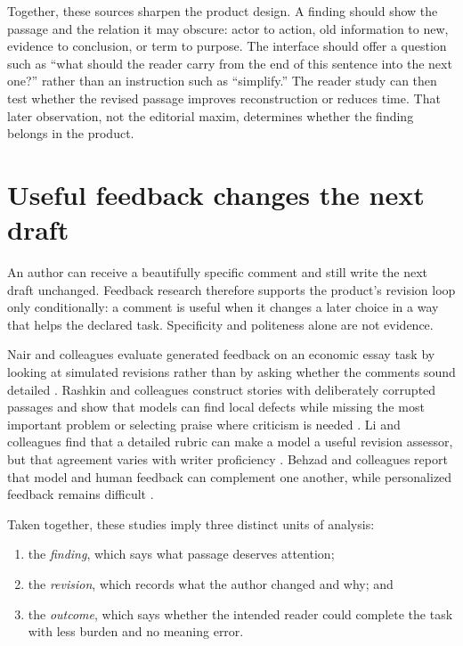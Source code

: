 Together, these sources sharpen the product design. A finding should show the
passage and the relation it may obscure: actor to action, old information to
new, evidence to conclusion, or term to purpose. The interface should offer a
question such as ``what should the reader carry from the end of this sentence
into the next one?'' rather than an instruction such as ``simplify.'' The
reader study can then test whether the revised passage improves reconstruction
or reduces time. That later observation, not the editorial maxim, determines
whether the finding belongs in the product.

\section{Useful feedback changes the next draft}
\label{sec:lit-feedback-foundations}

An author can receive a beautifully specific comment and still write the next
draft unchanged. Feedback research therefore supports the product's revision
loop only conditionally: a comment is useful when it changes a later choice in
a way that helps the declared task. Specificity and politeness alone are not
evidence.

Nair and colleagues evaluate generated feedback on an economic essay task by
looking at simulated revisions rather than by asking whether the comments
sound detailed \citep{nair2024closing}. Rashkin and colleagues construct
stories with deliberately corrupted passages and show that models can find
local defects while missing the most important problem or selecting praise
where criticism is needed \citep{rashkin2025story}. Li and colleagues find
that a detailed rubric can make a model a useful revision assessor, but that
agreement varies with writer proficiency \citep{li2024revisions}. Behzad and
colleagues report that model and human feedback can complement one another,
while personalized feedback remains difficult \citep{behzad2024feedback}.

Taken together, these studies imply three distinct units of analysis:

\begin{enumerate}
\item the \emph{finding}, which says what passage deserves attention;
\item the \emph{revision}, which records what the author changed and why; and
\item the \emph{outcome}, which says whether the intended reader could complete
      the task with less burden and no meaning error.
\end{enumerate}

